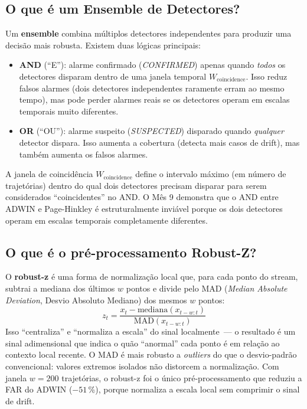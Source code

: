 \documentclass[11pt,a4paper]{article}
\begin{document}
\subsection*{O que \'e um Ensemble de Detectores?}

Um \textbf{ensemble} combina m\'ultiplos detectores independentes para produzir uma decis\~ao mais robusta. Existem duas l\'ogicas principais:
\begin{itemize}[leftmargin=1.4em,itemsep=2pt]
    \item \textbf{AND} (``E''): alarme confirmado (\emph{CONFIRMED}) apenas quando \emph{todos} os detectores disparam dentro de uma janela temporal $W_\text{coincidence}$. Isso reduz falsos alarmes (dois detectores independentes raramente erram ao mesmo tempo), mas pode perder alarmes reais se os detectores operam em escalas temporais muito diferentes.
    \item \textbf{OR} (``OU''): alarme suspeito (\emph{SUSPECTED}) disparado quando \emph{qualquer} detector dispara. Isso aumenta a cobertura (detecta mais casos de drift), mas tamb\'em aumenta os falsos alarmes.
\end{itemize}
A janela de coincid\^encia $W_\text{coincidence}$ define o intervalo m\'aximo (em n\'umero de trajet\'orias) dentro do qual dois detectores precisam disparar para serem considerados ``coincidentes'' no AND. O M\^es 9 demonstra que o AND entre ADWIN e Page-Hinkley \'e estruturalmente invi\'avel porque os dois detectores operam em escalas temporais completamente diferentes.

\subsection*{O que \'e o pr\'e-processamento Robust-Z?}

O \textbf{robust-z} \'e uma forma de normaliza\c{c}\~ao local que, para cada ponto do stream, subtrai a mediana dos \'ultimos $w$ pontos e divide pelo MAD (\emph{Median Absolute Deviation}, Desvio Absoluto Mediano) dos mesmos $w$ pontos:
\[
z_t = \frac{x_t - \mathrm{mediana}(x_{t-w:t})}{\mathrm{MAD}(x_{t-w:t})}
\]
Isso ``centraliza'' e ``normaliza a escala'' do sinal localmente~--- o resultado \'e um sinal adimensional que indica o qu\~ao ``anormal'' cada ponto \'e em rela\c{c}\~ao ao contexto local recente. O MAD \'e mais robusto a \emph{outliers} do que o desvio-padr\~ao convencional: valores extremos isolados n\~ao distorcem a normaliza\c{c}\~ao. Com janela $w = 200$ trajet\'orias, o robust-z foi o \'unico pr\'e-processamento que reduziu a FAR do ADWIN ($-51$\,\%), porque normaliza a escala local sem comprimir o sinal de drift.
\end{document}
